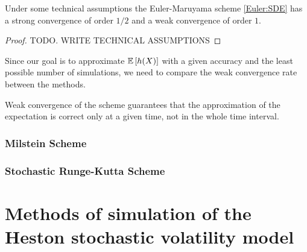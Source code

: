                 \begin{theorem}
                    Under some technical assumptions the Euler-Maruyama scheme \eqref{Euler:SDE} has a strong convergence of order $1/2$ and a weak convergence of order $1$.
                \end{theorem}
                \begin{proof}
                    {\color{red}TODO. WRITE TECHNICAL ASSUMPTIONS}
                \end{proof}
            
                Since our goal is to approximate $\mathbb{E}\left[h(X)\right]$ with a given accuracy and the least possible number of simulations, we need to compare the weak convergence rate between the methods.
                \begin{remark}
                    Weak convergence of the scheme guarantees that the approximation of the expectation is correct only at a given time, not in the whole time interval.
                \end{remark}

            \subsection{Milstein Scheme}

            \subsection{Stochastic Runge-Kutta Scheme}
                

\chapter{Methods of simulation of the Heston stochastic volatility model}
